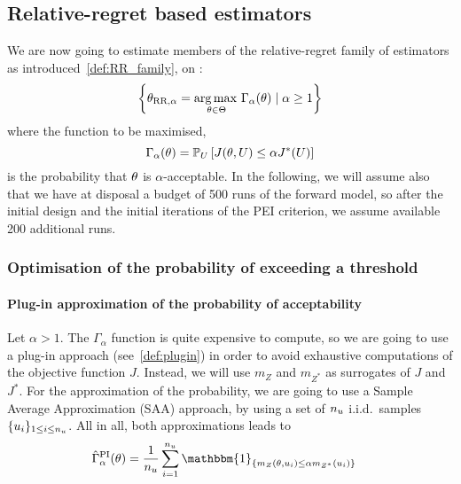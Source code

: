 \documentclass[../../Main_ManuscritThese.tex]{subfiles}
\newcommand\imgpath{/home/victor/acadwriting/Manuscrit/Text/Chapter5/img/}
\begin{document}
\subsection{Relative-regret based estimators}
\label{ssec:rr_estimators_croco}
We are now going to estimate members of the relative-regret family of
estimators as introduced~\cref{def:RR_family}, on
:
\begin{equation}
  \left\{\theta_{\mathrm{RR,\alpha}} = \operatorname*{arg\,max \,}_{\theta\in\Theta} \Gamma_{\alpha}(\theta) \mid \alpha \geq 1\right\}
\end{equation}
where the function to be maximised,
\begin{equation}
  \Gamma_{\alpha}(\theta) = \mathbb{P}_{U}\left[J(\theta,U) \leq \alpha J^*(U)\right]
\end{equation}
is the probability that $\theta$ is $\alpha$-acceptable.  In the
following, we will assume also that we have at disposal a budget of \num{500} runs of
the forward model, so after the initial design and the initial
iterations of the PEI criterion, we assume available \num{200}
additional runs.
%  

\subsubsection{Optimisation of the probability of exceeding a threshold}
\label{ssec:optim_prob_threshold}
\paragraph{Plug-in approximation of the probability of acceptability}

Let $\alpha > 1$. The $\Gamma_{\alpha}$ function is quite expensive to compute, so we
are going to use a plug-in approach (see~\cref{def:plugin}) in order
to avoid exhaustive computations of the objective function
$J$. Instead, we will use $m_Z$ and $m_{Z^*}$ as surrogates of $J$ and
$J^*$.  For the approximation of the probability, we are going to use
a Sample Average Approximation (SAA) approach, by using a set of
$n_u$ i.i.d.\ samples $\{u_i\}_{1\leq i \leq n_{u}}$.  All in
all, both approximations leads to
\begin{align}
  \hat{\Gamma}^{\mathrm{PI}}_{\alpha}(\kk) &= \frac{1}{n_\uu}\sum_{i=1}^{n_{\uu}} \mathbbm{1}_{\{m_Z(\kk, \uu_i) \leq \alpha m_{Z^*}(\uu_i)\}}
\end{align}
\end{document}
